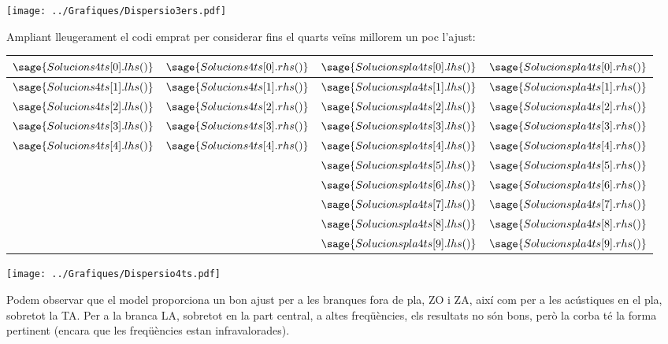 \documentclass[12pt]{article} %
\begin{document}
\begin{center}
\texttt{[image: ../Grafiques/Dispersio3ers.pdf]}
\end{center}

Ampliant lleugerament el codi emprat per considerar fins el quarts veïns millorem un poc l'ajust:

\begin{center}
\begin{tabular}{|c|c||c|c|}\hline
$\sage{Solucions4ts[0].lhs()}$ & $\sage{Solucions4ts[0].rhs()}$ & $\sage{Solucionspla4ts[0].lhs()}$ & $\sage{Solucionspla4ts[0].rhs()}$  \\ \hline
$\sage{Solucions4ts[1].lhs()}$ & $\sage{Solucions4ts[1].rhs()}$ & $\sage{Solucionspla4ts[1].lhs()}$ & $\sage{Solucionspla4ts[1].rhs()}$  \\ \hline
$\sage{Solucions4ts[2].lhs()}$ & $\sage{Solucions4ts[2].rhs()}$ & $\sage{Solucionspla4ts[2].lhs()}$ & $\sage{Solucionspla4ts[2].rhs()}$  \\ \hline
$\sage{Solucions4ts[3].lhs()}$ & $\sage{Solucions4ts[3].rhs()}$ & $\sage{Solucionspla4ts[3].lhs()}$ & $\sage{Solucionspla4ts[3].rhs()}$  \\ \hline
$\sage{Solucions4ts[4].lhs()}$ & $\sage{Solucions4ts[4].rhs()}$ & $\sage{Solucionspla4ts[4].lhs()}$ & $\sage{Solucionspla4ts[4].rhs()}$  \\ \hline
  &  & $\sage{Solucionspla4ts[5].lhs()}$ & $\sage{Solucionspla4ts[5].rhs()}$  \\ \hline
  &  & $\sage{Solucionspla4ts[6].lhs()}$ & $\sage{Solucionspla4ts[6].rhs()}$  \\ \hline
  &  & $\sage{Solucionspla4ts[7].lhs()}$ & $\sage{Solucionspla4ts[7].rhs()}$  \\ \hline
  &  & $\sage{Solucionspla4ts[8].lhs()}$ & $\sage{Solucionspla4ts[8].rhs()}$  \\ \hline
  &  & $\sage{Solucionspla4ts[9].lhs()}$ & $\sage{Solucionspla4ts[9].rhs()}$  \\ \hline
\end{tabular}
\end{center}

\begin{center}
\texttt{[image: ../Grafiques/Dispersio4ts.pdf]}
\end{center}


Podem observar que el model  proporciona un bon ajust per a les branques fora de pla, ZO i ZA, així com per a les acústiques en el pla, sobretot la TA. Per a la branca LA, sobretot en la part central, a altes freqüències, els resultats no són bons, però la corba té la forma pertinent (encara que les freqüències estan infravalorades).
\end{document}
